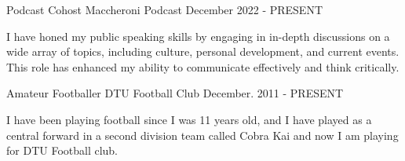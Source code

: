 

\begin{cventries}

  \cventry
    {Podcast Cohost} %
    {Maccheroni Podcast} %
    {} %
    {December 2022 - PRESENT} %
    {
      \begin{cvitems} %
        \item {I have honed my public speaking skills by engaging in in-depth discussions on a wide array of topics, including culture, personal development, and current events. This role has enhanced my ability to communicate effectively and think critically.}
      \end{cvitems}
    }

  \cventry
    {Amateur Footballer} %
    {DTU Football Club} %
    {} %
    {December. 2011 - PRESENT} %
    {
      \begin{cvitems} %
        \item {I have been playing football since I was 11 years old, and I have played as a central forward in a second division team called Cobra Kai and now I am playing for DTU Football club.}
      \end{cvitems}
    }

\end{cventries}
